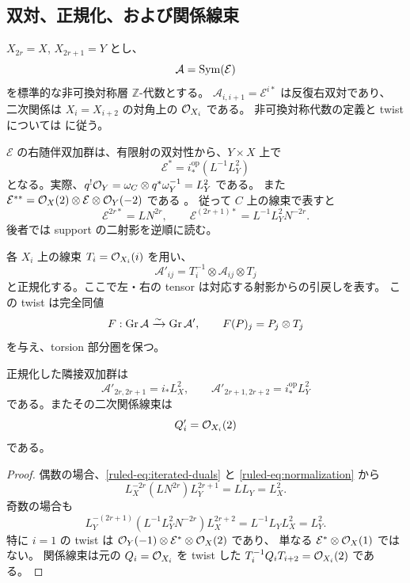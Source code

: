 \subsection{双対、正規化、および関係線束}

$X_{2r}=X$, $X_{2r+1}=Y$ とし、
\[
 \mathcal A=\operatorname{Sym}(\mathcal E)
\]
を標準的な非可換対称層 $\mathbb Z$-代数とする。
$\mathcal A_{i,i+1}=\mathcal E^{i*}$ は反復右双対であり、
二次関係は $X_i=X_{i+2}$ の対角上の $\mathcal O_{X_i}$ である。
非可換対称代数の定義と twist については
\cite[\S5]{VanDenBergh2012P1} に従う。

$\mathcal E$ の右随伴双加群は、有限射の双対性から、$Y\times X$ 上で
\begin{equation}\label{ruled-eq:right-dual}
 \mathcal E^*=i^{\mathrm{op}}_*(L^{-1}L_Y^2)
\end{equation}
となる。実際、$q^!\mathcal O_Y=\omega_C\otimes q^*\omega_Y^{-1}=L_Y^2$ である。
また
$\mathcal E^{**}=\mathcal O_X(2)\otimes\mathcal E\otimes\mathcal O_Y(-2)$
である \cite[Lemma 4.1.7]{VanDenBergh2012P1}。
従って $C$ 上の線束で表すと
\begin{equation}\label{ruled-eq:iterated-duals}
 \mathcal E^{2r*}=L N^{2r},\qquad
 \mathcal E^{(2r+1)*}=L^{-1}L_Y^2N^{-2r}.
\end{equation}
後者では support の二射影を逆順に読む。

各 $X_i$ 上の線束 $T_i=\mathcal O_{X_i}(i)$ を用い、
\begin{equation}\label{ruled-eq:normalization}
 \mathcal A'_{ij}=T_i^{-1}\otimes\mathcal A_{ij}\otimes T_j
\end{equation}
と正規化する。ここで左・右の tensor は対応する射影からの引戻しを表す。
この twist は完全同値
\begin{equation}\label{ruled-eq:twist-equivalence}
 F:\operatorname{Gr}\mathcal A\xrightarrow{\sim}\operatorname{Gr}\mathcal A',\qquad
 F(P)_j=P_j\otimes T_j
\end{equation}
を与え、torsion 部分圏を保つ。

\begin{lemma}\label{ruled-lem:normalized}
正規化した隣接双加群は
\[
 \mathcal A'_{2r,2r+1}=i_*L_X^2,\qquad
 \mathcal A'_{2r+1,2r+2}=i^{\mathrm{op}}_*L_Y^2
\]
である。またその二次関係線束は
\[
 Q'_i=\mathcal O_{X_i}(2)
\]
である。
\end{lemma}

\begin{proof}
偶数の場合、\eqref{ruled-eq:iterated-duals} と \eqref{ruled-eq:normalization} から
\[
 L_X^{-2r}(L N^{2r})L_Y^{2r+1}=L L_Y=L_X^2.
\]
奇数の場合も
\[
 L_Y^{-(2r+1)}(L^{-1}L_Y^2N^{-2r})L_X^{2r+2}
 =L^{-1}L_YL_X^2=L_Y^2.
\]
特に $i=1$ の twist は $\mathcal O_Y(-1)\otimes\mathcal E^*\otimes\mathcal O_X(2)$ であり、
単なる $\mathcal E^*\otimes\mathcal O_X(1)$ ではない。
関係線束は元の $Q_i=\mathcal O_{X_i}$ を twist した
$T_i^{-1}Q_iT_{i+2}=\mathcal O_{X_i}(2)$ である。
\end{proof}

